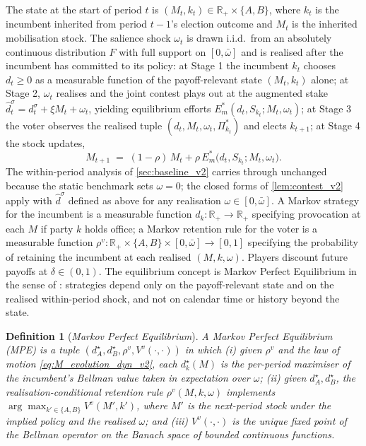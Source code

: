 \documentclass[11pt,twoside]{extarticle}
\newtheorem{definition}{Definition}
\begin{document}
The state at the start of period $t$ is $(M_t,k_t)\in\mathbb{R}_+\times\{A,B\}$, where $k_t$ is the incumbent inherited from period $t-1$'s election outcome and $M_t$ is the inherited mobilisation stock. The salience shock $\omega_t$ is drawn i.i.d.\ from an absolutely continuous distribution $F$ with full support on $[0,\bar\omega]$ and is realised after the incumbent has committed to its policy: at Stage 1 the incumbent $k_t$ chooses $d_t\ge 0$ as a measurable function of the payoff-relevant state $(M_t,k_t)$ alone; at Stage 2, $\omega_t$ realises and the joint contest plays out at the augmented stake $\hat d_t^\sigma=d_t^\sigma+\xi M_t+\omega_t$, yielding equilibrium efforts $E_m^*(d_t,S_{k_t};M_t,\omega_t)$; at Stage 3 the voter observes the realised tuple $(d_t,M_t,\omega_t,\Pi_{k_t}^*)$ and elects $k_{t+1}$; at Stage 4 the stock updates,
\begin{equation}\label{eq:M_evolution_dyn_v2}
    M_{t+1}\;=\;(1-\rho)\,M_t+\rho\,E_m^*\big(d_t,S_{k_t};M_t,\omega_t\big).
\end{equation}
The within-period analysis of \autoref{sec:baseline_v2} carries through unchanged because the static benchmark sets $\omega=0$; the closed forms of \autoref{lem:contest_v2} apply with $\hat d^\sigma$ defined as above for any realisation $\omega\in[0,\bar\omega]$. A Markov strategy for the incumbent is a measurable function $d_k:\mathbb{R}_+\to\mathbb{R}_+$ specifying provocation at each $M$ if party $k$ holds office; a Markov retention rule for the voter is a measurable function $\rho^v:\mathbb{R}_+\times\{A,B\}\times[0,\bar\omega]\to[0,1]$ specifying the probability of retaining the incumbent at each realised $(M,k,\omega)$. Players discount future payoffs at $\delta\in(0,1)$. The equilibrium concept is Markov Perfect Equilibrium in the sense of \citet{maskinMarkovPerfectEquilibrium2001}: strategies depend only on the payoff-relevant state and on the realised within-period shock, and not on calendar time or history beyond the state.

\begin{definition}[\emph{Markov Perfect Equilibrium}]\label{def:MPE_v2}
A Markov Perfect Equilibrium (MPE) is a tuple $(d_A^\star,d_B^\star,\rho^v,V^v(\cdot,\cdot))$ in which (i) given $\rho^v$ and the law of motion \autoref{eq:M_evolution_dyn_v2}, each $d_k^\star(M)$ is the per-period maximiser of the incumbent's Bellman value taken in expectation over $\omega$; (ii) given $d_A^\star,d_B^\star$, the realisation-conditional retention rule $\rho^v(M,k,\omega)$ implements $\arg\max_{k'\in\{A,B\}}V^v(M',k')$, where $M'$ is the next-period stock under the implied policy and the realised $\omega$; and (iii) $V^v(\cdot,\cdot)$ is the unique fixed point of the Bellman operator on the Banach space of bounded continuous functions.
\end{definition}
\end{document}
